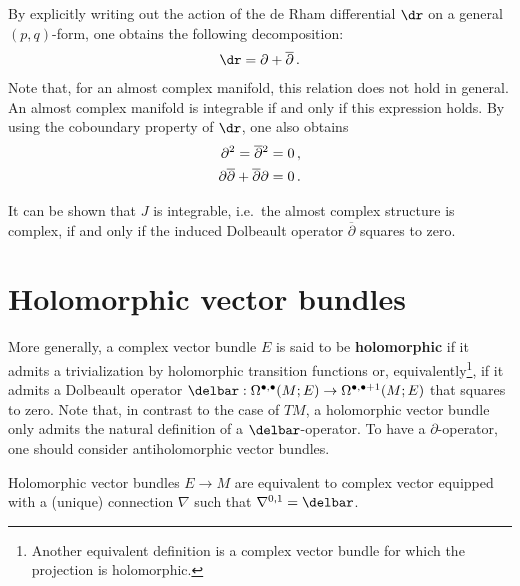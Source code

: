     \begin{property}
        By explicitly writing out the action of the de Rham differential $\dr$ on a general $(p,q)$-form, one obtains the following decomposition:
        \begin{gather}
            \dr=\partial+\overline{\partial}\,.
        \end{gather}
        Note that, for an almost complex manifold, this relation does not hold in general. An almost complex manifold is integrable if and only if this expression holds. By using the coboundary property of $\dr$, one also obtains
        \begin{gather}
            \begin{aligned}
                \partial^2 = \overline{\partial}\vphantom{\partial}^2 &= 0\,,\\
                \partial\overline{\partial} + \overline{\partial}\partial &= 0\,.
            \end{aligned}
        \end{gather}
    \end{property}
    \begin{remark}[Integrability]
        It can be shown that $J$ is integrable, i.e.~the almost complex structure is complex, if and only if the induced Dolbeault operator $\overline{\partial}$ squares to zero.
    \end{remark}

\section{Holomorphic vector bundles}

    More generally, a complex vector bundle $E$ is said to be \textbf{holomorphic} if it admits a trivialization by holomorphic transition functions or, equivalently\footnote{Another equivalent definition is a complex vector bundle for which the projection is holomorphic.}, if it admits a Dolbeault operator $\delbar:\Omega^{\bullet,\bullet}(M;E)\rightarrow\Omega^{\bullet,\bullet+1}(M;E)$ that squares to zero. Note that, in contrast to the case of $TM$, a holomorphic vector bundle only admits the natural definition of a $\delbar$-operator. To have a $\partial$-operator, one should consider antiholomorphic vector bundles.

    \begin{theorem}\label{complex:koszul_malgrange}
        Holomorphic vector bundles $E\rightarrow M$ are equivalent to complex vector equipped with a (unique) connection $\nabla$ such that $\nabla^{0,1}=\delbar$.
    \end{theorem}

